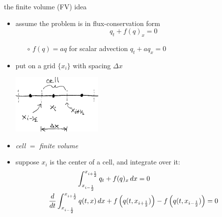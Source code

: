 \documentclass[10pt,dvipsnames,usepdftitle=false,
hyperref={pdftitle = {Finite volume methods},
    pdfauthor = {Ed Bueler}}]{beamer}
\newcommand{\xiphalf}{{x_{i+\frac{1}{2}}}}
\newcommand{\ximhalf}{{x_{i-\frac{1}{2}}}}
\begin{document}
\begin{frame}{the finite volume (FV) idea}

\begin{itemize}
\item assume the problem is in flux-conservation form
    $$q_t + f(q)_x = 0$$

    \begin{itemize}
    \item[$\circ$] $f(q) = aq$ for scalar advection $q_t + a q_x = 0$
    \end{itemize}
\item put on a grid $\{x_i\}$ with spacing $\Delta x$

\vspace{-8mm}
\hfill \includegraphics[width=0.35\textwidth]{figs/fvsketch}
\vspace{-4mm}
\item \emph{cell} $=$ \emph{finite volume}
\item suppose $x_i$ is the center of a cell, and integrate over it:
\begin{gather*}
\int_\ximhalf^\xiphalf q_t + f(q)_x \,dx = 0 \hspace{20mm}  \\
\frac{d}{dt} \int_\ximhalf^\xiphalf q(t,x) \,dx + f\left(q(t,\xiphalf)\right) - f\left(q(t,\ximhalf)\right) = 0
\end{gather*}
\end{itemize}
\end{frame}
\end{document}
